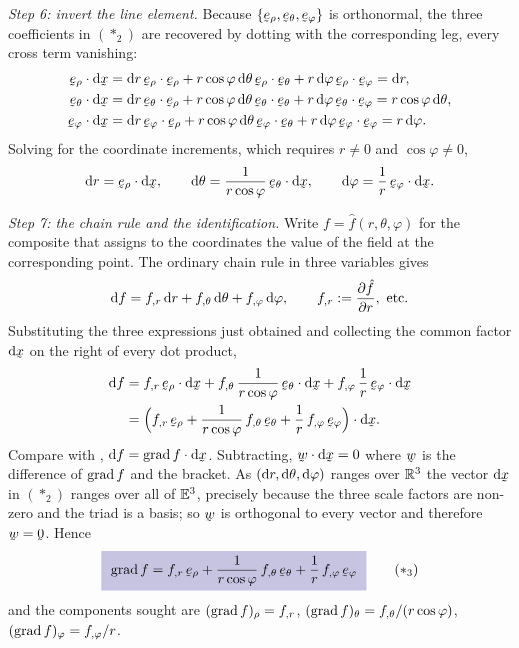 \begin{solution}
\emph{Step 6: invert the line element.}
Because $\{\berho,\beth,\beph\}$ is orthonormal, the three coefficients in
$(\ast_2)$ are recovered by dotting with the corresponding leg, every cross
term vanishing:
\[
\begin{aligned}
   \ip\berho{\dl\bx}&=\dl r\,\ip\berho\berho
     +r\cos\varphi\,\dl\theta\,\ip\berho\beth
     +r\,\dl\varphi\,\ip\berho\beph=\dl r,\\
   \ip\beth{\dl\bx}&=\dl r\,\ip\beth\berho
     +r\cos\varphi\,\dl\theta\,\ip\beth\beth
     +r\,\dl\varphi\,\ip\beth\beph=r\cos\varphi\,\dl\theta,\\
   \ip\beph{\dl\bx}&=\dl r\,\ip\beph\berho
     +r\cos\varphi\,\dl\theta\,\ip\beph\beth
     +r\,\dl\varphi\,\ip\beph\beph=r\,\dl\varphi .
\end{aligned}
\]
Solving for the coordinate increments, which requires $r\neq0$ and
$\cos\varphi\neq0$,
\[
   \dl r=\ip\berho{\dl\bx},\qquad
   \dl\theta=\frac{1}{r\cos\varphi}\,\ip\beth{\dl\bx},\qquad
   \dl\varphi=\frac{1}{r}\,\ip\beph{\dl\bx}.
\]

\emph{Step 7: the chain rule and the identification.}
Write $f=\hat f(r,\theta,\varphi)$ for the composite that assigns to the
coordinates the value of the field at the corresponding point. The ordinary
chain rule in three variables gives
\[
   \dl f=f_{,r}\,\dl r+f_{,\theta}\,\dl\theta+f_{,\varphi}\,\dl\varphi,
   \qquad f_{,r}:=\frac{\partial\hat f}{\partial r},\ \text{etc.}
\]
Substituting the three expressions just obtained and collecting the common
factor $\dl\bx$ on the right of every dot product,
\[
\begin{aligned}
   \dl f&=f_{,r}\,\ip\berho{\dl\bx}
        +f_{,\theta}\,\frac{1}{r\cos\varphi}\,\ip\beth{\dl\bx}
        +f_{,\varphi}\,\frac{1}{r}\,\ip\beph{\dl\bx}\\
   &=\Big(f_{,r}\,\berho+\frac{1}{r\cos\varphi}\,f_{,\theta}\,\beth
        +\frac{1}{r}\,f_{,\varphi}\,\beph\Big)\cdot\dl\bx .
\end{aligned}
\]
Compare with , $\dl f=\ip{\grad f}{\dl\bx}$. Subtracting,
$\ip{\bw}{\dl\bx}=0$ where $\bw$ is the difference of $\operatorname{grad} f$ and the
bracket. As $(\mathrm{d} r,\mathrm{d}\theta,\mathrm{d}\varphi)$ ranges over $\mathbb{R}^{3}$ the vector
$\dl\bx$ in $(\ast_2)$ ranges over all of $\mathbb{E}^{3}$, precisely because the three
scale factors are non-zero and the triad is a basis; so $\bw$ is orthogonal
to every vector and therefore $\bw=\bze$. Hence
\begin{equation}
   \boxed{\ \grad f=f_{,r}\,\berho
     +\frac{1}{r\cos\varphi}\,f_{,\theta}\,\beth
     +\frac{1}{r}\,f_{,\varphi}\,\beph\ }
   \tag{$\ast_3$}
\end{equation}
and the components sought are
$(\operatorname{grad} f)_{\rho}=f_{,r}$,
$(\operatorname{grad} f)_{\theta}=f_{,\theta}/(r\cos\varphi)$,
$(\operatorname{grad} f)_{\varphi}=f_{,\varphi}/r$.


\end{solution}
